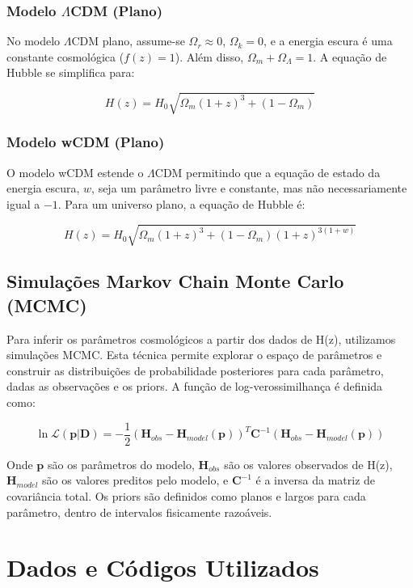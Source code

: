 \documentclass{article}
\begin{document}
\subsubsection{Modelo $\Lambda$CDM (Plano)}

No modelo $\Lambda$CDM plano, assume-se $\Omega_r \approx 0$, $\Omega_k = 0$, e a energia escura é uma constante cosmológica ($f(z)=1$). Além disso, $\Omega_m + \Omega_{\Lambda} = 1$. A equação de Hubble se simplifica para:

$$ H(z) = H_0 \sqrt{\Omega_m (1+z)^3 + (1-\Omega_m)} $$

\subsubsection{Modelo wCDM (Plano)}

O modelo wCDM estende o $\Lambda$CDM permitindo que a equação de estado da energia escura, $w$, seja um parâmetro livre e constante, mas não necessariamente igual a $-1$. Para um universo plano, a equação de Hubble é:

$$ H(z) = H_0 \sqrt{\Omega_m (1+z)^3 + (1-\Omega_m)(1+z)^{3(1+w)}} $$

\subsection{Simulações Markov Chain Monte Carlo (MCMC)}

Para inferir os parâmetros cosmológicos a partir dos dados de H(z), utilizamos simulações MCMC. Esta técnica permite explorar o espaço de parâmetros e construir as distribuições de probabilidade posteriores para cada parâmetro, dadas as observações e os priors. A função de log-verossimilhança é definida como:

$$ \ln \mathcal{L}(\mathbf{p} | \mathbf{D}) = -\frac{1}{2} (\mathbf{H}_{obs} - \mathbf{H}_{model}(\mathbf{p}))^T \mathbf{C}^{-1} (\mathbf{H}_{obs} - \mathbf{H}_{model}(\mathbf{p})) $$

Onde $\mathbf{p}$ são os parâmetros do modelo, $\mathbf{H}_{obs}$ são os valores observados de H(z), $\mathbf{H}_{model}$ são os valores preditos pelo modelo, e $\mathbf{C}^{-1}$ é a inversa da matriz de covariância total. Os priors são definidos como planos e largos para cada parâmetro, dentro de intervalos fisicamente razoáveis.

\section{Dados e Códigos Utilizados}
\end{document}
